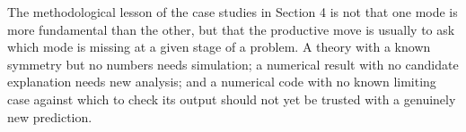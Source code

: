 The methodological lesson of the case studies in Section 4 is not that one mode
is more fundamental than the other, but that the productive move is usually to
ask which mode is missing at a given stage of a problem. A theory with a known
symmetry but no numbers needs simulation; a numerical result with no candidate
explanation needs new analysis; and a numerical code with no known limiting
case against which to check its output should not yet be trusted with a
genuinely new prediction.


